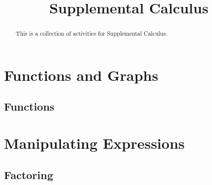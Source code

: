 \documentclass{ximera}
\title{Supplemental Calculus}
\begin{document}
\begin{abstract}
This is a collection of activities for Supplemental Calculus.
\end{abstract}

\maketitle

\renewcommand{\maketitle}{}

\section{Functions and Graphs}

\subsection{Functions}



\section{Manipulating Expressions}

\subsection{Factoring}



\end{document}
